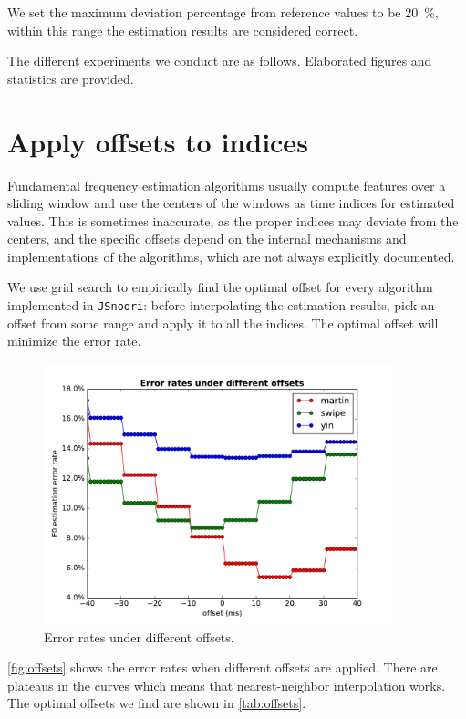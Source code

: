 \documentclass[11pt,a4paper]{report}
\begin{document}
We set the maximum deviation percentage from reference values to be \SI{20}{\percent}, within this range the estimation results are considered correct.

The different experiments we conduct are as follows.
Elaborated figures and statistics are provided.

\newpage

\section{Apply offsets to indices}

Fundamental frequency estimation algorithms usually compute features over a sliding window and use the centers of the windows as time indices for estimated values.
This is sometimes inaccurate, as the proper indices may deviate from the centers, and the specific offsets depend on the internal mechanisms and implementations of the algorithms, which are not always explicitly documented.

We use grid search to empirically find the optimal offset for every algorithm implemented in \texttt{JSnoori}: before interpolating the estimation results, pick an offset from some range and apply it to all the indices.
The optimal offset will minimize the error rate.

\begin{figure}[htbp]
  \centering
  \includegraphics[width=0.9\textwidth]{error_rates_vs_offsets.pdf}
  \caption{Error rates under different offsets.} \label{fig:offsets}
\end{figure}

\autoref{fig:offsets} shows the error rates when different offsets are applied.
There are plateaus in the curves which means that nearest-neighbor interpolation works.
The optimal offsets we find are shown in \autoref{tab:offsets}.
\end{document}

